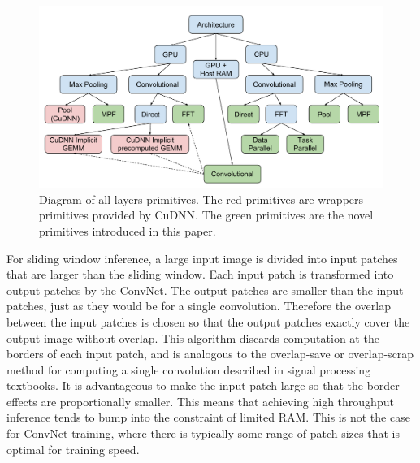 \documentclass[conference]{./IEEEtran/IEEEtran}
\begin{document}
  \begin{figure}
    \begin{center}
      \includegraphics[width=0.99\columnwidth]{fig/alllayersram.pdf}
    \end{center}
    \caption{Diagram of all layers primitives.  The red primitives are
      wrappers primitives provided by CuDNN.  The green primitives are
      the novel primitives introduced in this paper.}
    \label{fig:layers}
  \end{figure}


  For sliding window inference, a large input image is divided into
  input patches that are larger than the sliding window.  Each input
  patch is transformed into output patches by the ConvNet.  The output
  patches are smaller than the input patches, just as they would be
  for a single convolution. Therefore the overlap between the input
  patches is chosen so that the output patches exactly cover the
  output image without overlap. This algorithm discards computation at
  the borders of each input patch, and is analogous to the
  overlap-save or overlap-scrap method for computing a single
  convolution described in signal processing textbooks.  It is
  advantageous to make the input patch large so that the border
  effects are proportionally smaller.  This means that achieving high
  throughput inference tends to bump into the constraint of limited
  RAM.  This is not the case for ConvNet training, where there is
  typically some range of patch sizes that is optimal for training
  speed.
\end{document}
